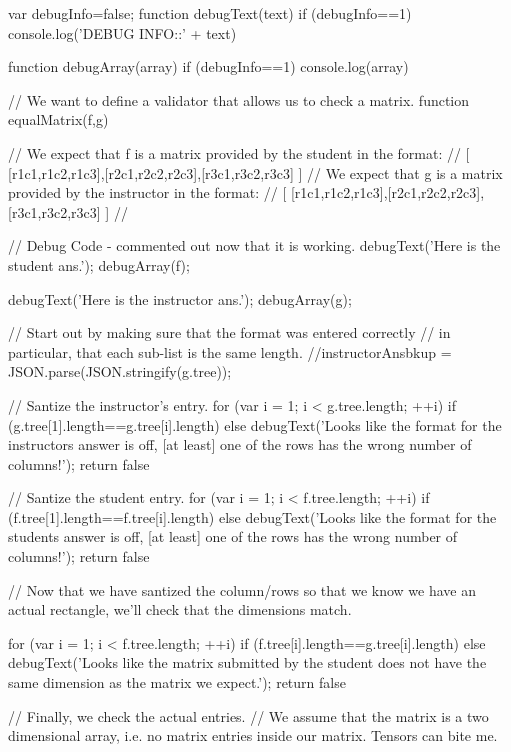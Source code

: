 \documentclass{ximera}
\begin{document}
\begin{javascript}
var debugInfo=false;
function debugText(text) {
    if (debugInfo==1) {
    console.log('DEBUG INFO::' + text)
    }
}

function debugArray(array) {
    if (debugInfo==1) {
    console.log(array)
    }
}

// We want to define a validator that allows us to check a matrix.
function equalMatrix(f,g) {
    // We expect that f is a matrix provided by the student in the format:
    //      [ [r1c1,r1c2,r1c3],[r2c1,r2c2,r2c3],[r3c1,r3c2,r3c3] ]
    // We expect that g is a matrix provided by the instructor in the format:
    //      [ [r1c1,r1c2,r1c3],[r2c1,r2c2,r2c3],[r3c1,r3c2,r3c3] ]
    //
    
    //   Debug Code - commented out now that it is working.
    debugText('Here is the student ans.');
    debugArray(f);
    
    debugText('Here is the instructor ans.');
    debugArray(g);
    
    // Start out by making sure that the format was entered correctly
    //  in particular, that each sub-list is the same length.
    //instructorAnsbkup = JSON.parse(JSON.stringify(g.tree));
    
    // Santize the instructor's entry.
    for (var i = 1; i < g.tree.length; ++i) {
        if (g.tree[1].length==g.tree[i].length) {
        } else {
            debugText('Looks like the format for the instructors answer is off, [at least] one of the rows has the wrong number of columns!');
            return false
        }
    }

    // Santize the student entry.
    for (var i = 1; i < f.tree.length; ++i) {
        if (f.tree[1].length==f.tree[i].length) {
        } else {
            debugText('Looks like the format for the students answer is off, [at least] one of the rows has the wrong number of columns!');
            return false
        }
    }
    
    // Now that we have santized the column/rows so that we know we have an actual rectangle, we'll check that the dimensions match.
    
    for (var i = 1; i < f.tree.length; ++i) {
        if (f.tree[i].length==g.tree[i].length) {
        } else {
            debugText('Looks like the matrix submitted by the student does not have the same dimension as the matrix we expect.');
            return false
        }
    }
    
    // Finally, we check the actual entries. 
    // We assume that the matrix is a two dimensional array, i.e. no matrix entries inside our matrix. Tensors can bite me.
    
}
\end{javascript}
\end{document}
